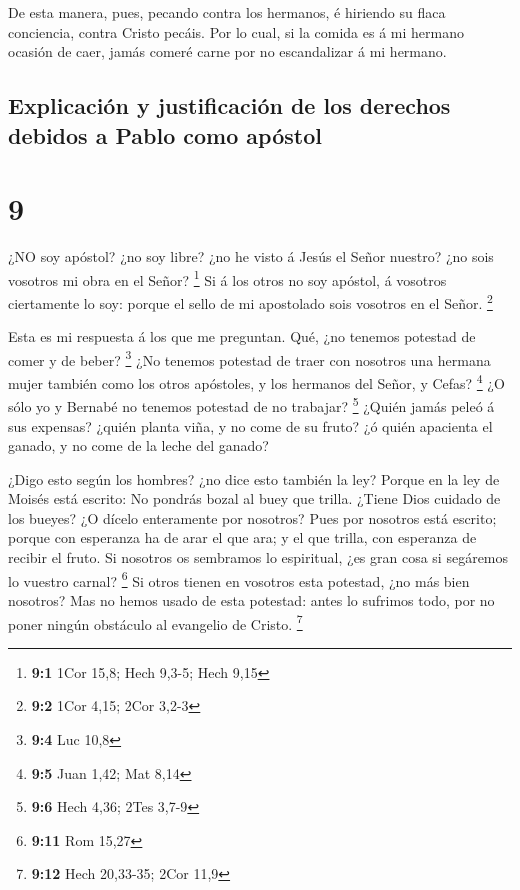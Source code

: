  De esta manera, pues, pecando contra los hermanos, é
hiriendo su flaca conciencia, contra Cristo pecáis.  Por lo
cual, si la comida es á mi hermano ocasión de caer, jamás comeré carne
por no escandalizar á mi hermano.

\hypertarget{explicaciuxf3n-y-justificaciuxf3n-de-los-derechos-debidos-a-pablo-como-apuxf3stol}{%
\subsection{Explicación y justificación de los derechos debidos a Pablo
como
apóstol}\label{explicaciuxf3n-y-justificaciuxf3n-de-los-derechos-debidos-a-pablo-como-apuxf3stol}}

\hypertarget{section-8}{%
\section{9}\label{section-8}}

 ¿NO soy apóstol? ¿no soy libre? ¿no he visto á Jesús el
Señor nuestro? ¿no sois vosotros mi obra en el Señor? \footnote{\textbf{9:1}
  1Cor 15,8; Hech 9,3-5; Hech 9,15}  Si á los otros no soy
apóstol, á vosotros ciertamente lo soy: porque el sello de mi apostolado
sois vosotros en el Señor. \footnote{\textbf{9:2} 1Cor 4,15; 2Cor 3,2-3}

 Esta es mi respuesta á los que me preguntan. 
Qué, ¿no tenemos potestad de comer y de beber? \footnote{\textbf{9:4}
  Luc 10,8}  ¿No tenemos potestad de traer con nosotros una
hermana mujer también como los otros apóstoles, y los hermanos del
Señor, y Cefas? \footnote{\textbf{9:5} Juan 1,42; Mat 8,14} 
¿O sólo yo y Bernabé no tenemos potestad de no trabajar? \footnote{\textbf{9:6}
  Hech 4,36; 2Tes 3,7-9}  ¿Quién jamás peleó á sus expensas?
¿quién planta viña, y no come de su fruto? ¿ó quién apacienta el ganado,
y no come de la leche del ganado?

 ¿Digo esto según los hombres? ¿no dice esto también la ley?
 Porque en la ley de Moisés está escrito: No pondrás bozal
al buey que trilla. ¿Tiene Dios cuidado de los bueyes?  ¿O
dícelo enteramente por nosotros? Pues por nosotros está escrito; porque
con esperanza ha de arar el que ara; y el que trilla, con esperanza de
recibir el fruto.  Si nosotros os sembramos lo espiritual,
¿es gran cosa si segáremos lo vuestro carnal? \footnote{\textbf{9:11}
  Rom 15,27}  Si otros tienen en vosotros esta potestad,
¿no más bien nosotros? Mas no hemos usado de esta potestad: antes lo
sufrimos todo, por no poner ningún obstáculo al evangelio de Cristo.
\footnote{\textbf{9:12} Hech 20,33-35; 2Cor 11,9}

